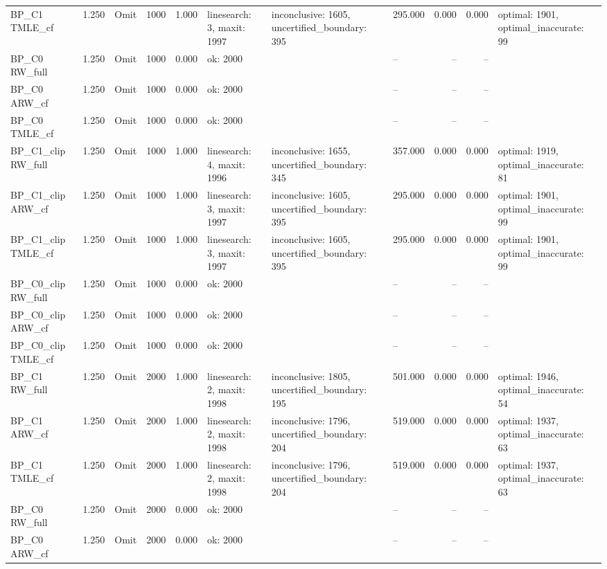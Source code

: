 \begin{tabular}{llllrlllrrl}
BP\_C1 TMLE\_cf & 1.250 & Omit & 1000 & 1.000 & linesearch: 3, maxit: 1997 & inconclusive: 1605, uncertified\_boundary: 395 & 295.000 & 0.000 & 0.000 & optimal: 1901, optimal\_inaccurate: 99 \\
BP\_C0 RW\_full & 1.250 & Omit & 1000 & 0.000 & ok: 2000 &  & -- & -- & -- &  \\
BP\_C0 ARW\_cf & 1.250 & Omit & 1000 & 0.000 & ok: 2000 &  & -- & -- & -- &  \\
BP\_C0 TMLE\_cf & 1.250 & Omit & 1000 & 0.000 & ok: 2000 &  & -- & -- & -- &  \\
BP\_C1\_clip RW\_full & 1.250 & Omit & 1000 & 1.000 & linesearch: 4, maxit: 1996 & inconclusive: 1655, uncertified\_boundary: 345 & 357.000 & 0.000 & 0.000 & optimal: 1919, optimal\_inaccurate: 81 \\
BP\_C1\_clip ARW\_cf & 1.250 & Omit & 1000 & 1.000 & linesearch: 3, maxit: 1997 & inconclusive: 1605, uncertified\_boundary: 395 & 295.000 & 0.000 & 0.000 & optimal: 1901, optimal\_inaccurate: 99 \\
BP\_C1\_clip TMLE\_cf & 1.250 & Omit & 1000 & 1.000 & linesearch: 3, maxit: 1997 & inconclusive: 1605, uncertified\_boundary: 395 & 295.000 & 0.000 & 0.000 & optimal: 1901, optimal\_inaccurate: 99 \\
BP\_C0\_clip RW\_full & 1.250 & Omit & 1000 & 0.000 & ok: 2000 &  & -- & -- & -- &  \\
BP\_C0\_clip ARW\_cf & 1.250 & Omit & 1000 & 0.000 & ok: 2000 &  & -- & -- & -- &  \\
BP\_C0\_clip TMLE\_cf & 1.250 & Omit & 1000 & 0.000 & ok: 2000 &  & -- & -- & -- &  \\
BP\_C1 RW\_full & 1.250 & Omit & 2000 & 1.000 & linesearch: 2, maxit: 1998 & inconclusive: 1805, uncertified\_boundary: 195 & 501.000 & 0.000 & 0.000 & optimal: 1946, optimal\_inaccurate: 54 \\
BP\_C1 ARW\_cf & 1.250 & Omit & 2000 & 1.000 & linesearch: 2, maxit: 1998 & inconclusive: 1796, uncertified\_boundary: 204 & 519.000 & 0.000 & 0.000 & optimal: 1937, optimal\_inaccurate: 63 \\
BP\_C1 TMLE\_cf & 1.250 & Omit & 2000 & 1.000 & linesearch: 2, maxit: 1998 & inconclusive: 1796, uncertified\_boundary: 204 & 519.000 & 0.000 & 0.000 & optimal: 1937, optimal\_inaccurate: 63 \\
BP\_C0 RW\_full & 1.250 & Omit & 2000 & 0.000 & ok: 2000 &  & -- & -- & -- &  \\
BP\_C0 ARW\_cf & 1.250 & Omit & 2000 & 0.000 & ok: 2000 &  & -- & -- & -- &  \\

\end{tabular}
